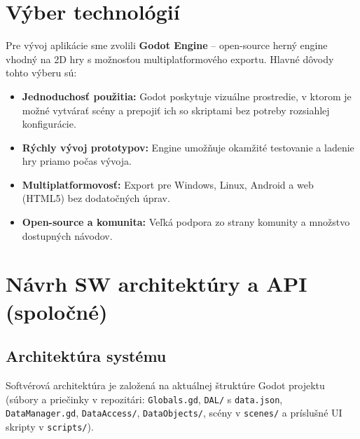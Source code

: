 \documentclass[a4paper,12pt]{article}
\begin{document}
    	
    	\section{Výber technológií}
    	Pre vývoj aplikácie sme zvolili \textbf{Godot Engine} – open-source herný engine vhodný na 2D hry s možnosťou multiplatformového exportu. Hlavné dôvody tohto výberu sú:
    	
    	\begin{itemize}
    		\item \textbf{Jednoduchosť použitia:} Godot poskytuje vizuálne prostredie, v ktorom je možné vytvárať scény a prepojiť ich so skriptami bez potreby rozsiahlej konfigurácie.
    		\item \textbf{Rýchly vývoj prototypov:} Engine umožňuje okamžité testovanie a ladenie hry priamo počas vývoja.
    		\item \textbf{Multiplatformovosť:} Export pre Windows, Linux, Android a web (HTML5) bez dodatočných úprav.
    		\item \textbf{Open-source a komunita:} Veľká podpora zo strany komunity a množstvo dostupných návodov.
    	\end{itemize}
    	
    	\section{Návrh SW architektúry a API (spoločné)}
    	\subsection{Architektúra systému}
    	Softvérová architektúra je založená na aktuálnej štruktúre Godot projektu (súbory a priečinky v repozitári: \texttt{Globals.gd}, \texttt{DAL/} s \texttt{data.json}, \texttt{DataManager.gd}, \texttt{DataAccess/}, \texttt{DataObjects/}, scény v \texttt{scenes/} a príslušné UI skripty v \texttt{scripts/}).
    	
\end{document}
